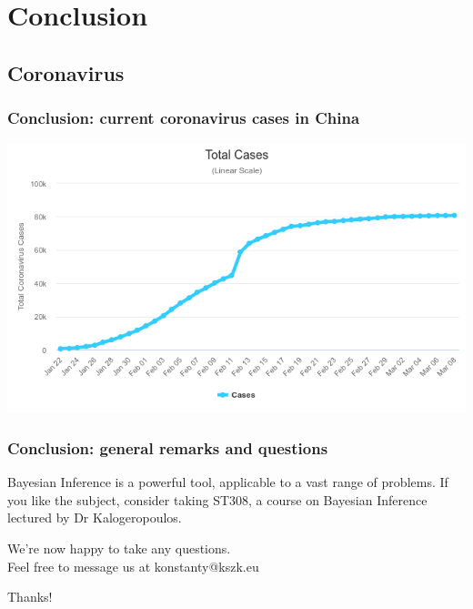 \documentclass{beamer}
\begin{document}
\section{Conclusion}
\subsection{Coronavirus}

\begin{frame}
    \frametitle{Conclusion: current coronavirus cases in China}
    \includegraphics[width=\linewidth]{corona.png}
\end{frame}

\begin{frame}
    \frametitle{Conclusion: general remarks and questions}
    Bayesian Inference is a powerful tool, applicable to a vast range of problems. If you like the subject, consider taking ST308, a course on Bayesian Inference lectured by Dr Kalogeropoulos.
    \vspace{1em}

    We're now happy to take any questions. \\
    Feel free to message us at konstanty{@}kszk.eu
    \vspace{2em}
    \Large
    \begin{center}
    Thanks!
    \end{center}
\end{frame}
\end{document}
